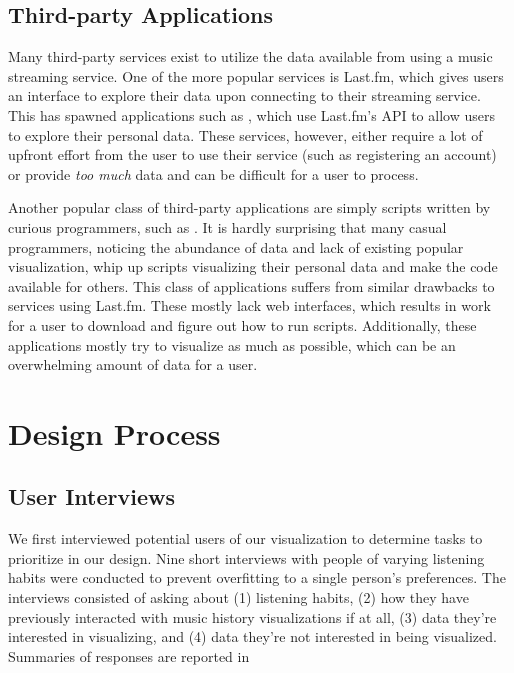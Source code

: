 \documentclass[journal]{vgtc}                %
\begin{document}
\subsection{Third-party Applications}

Many third-party services exist to utilize the data available from using a music streaming service. One of the more popular services is Last.fm, which gives users an interface to explore their data upon connecting to their streaming service. This has spawned applications such as \cite{Pre08,Dan12}, which use Last.fm's API to allow users to explore their personal data.
These services, however, either require a lot of upfront effort from the user to use their service (such as registering an account) or provide \emph{too much} data and can be difficult for a user to process.

Another popular class of third-party applications are simply scripts written by curious programmers, such as \cite{Boe16}. It is hardly surprising that many casual programmers, noticing the abundance of data and lack of existing popular visualization, whip up scripts visualizing their personal data and make the code available for others. This class of applications suffers from similar drawbacks to services using Last.fm. These mostly lack web interfaces, which results in work for a user to download and figure out how to run scripts. Additionally, these applications mostly try to visualize as much as possible, which can be an overwhelming amount of data for a user.

\section{Design Process}

\subsection{User Interviews}

We first interviewed potential users of our visualization to determine tasks to prioritize in our design. Nine short interviews with people of varying listening habits were conducted to prevent overfitting to a single person's preferences. The interviews consisted of asking about (1) listening habits, (2) how they have previously interacted with music history visualizations if at all, (3) data they're interested in visualizing, and (4) data they're not interested in being visualized. Summaries of responses are reported in %
\end{document}
